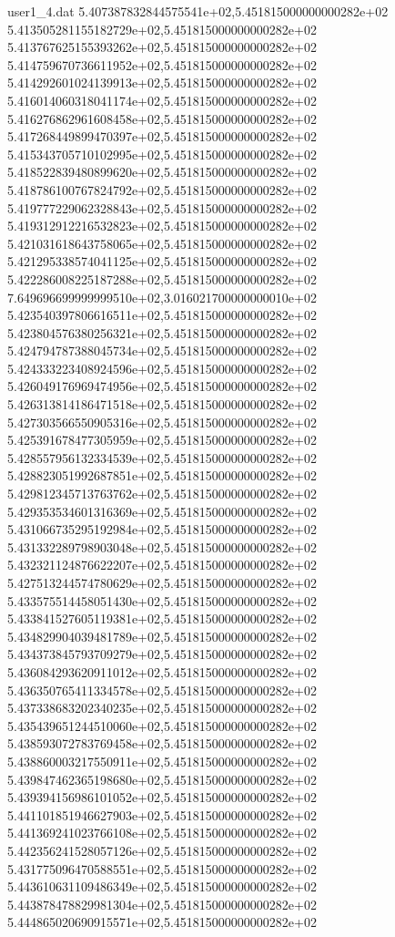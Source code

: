 \begin{filecontents}{user1_4.dat}
5.407387832844575541e+02,5.451815000000000282e+02
5.413505281155182729e+02,5.451815000000000282e+02
5.413767625155393262e+02,5.451815000000000282e+02
5.414759670736611952e+02,5.451815000000000282e+02
5.414292601024139913e+02,5.451815000000000282e+02
5.416014060318041174e+02,5.451815000000000282e+02
5.416276862961608458e+02,5.451815000000000282e+02
5.417268449899470397e+02,5.451815000000000282e+02
5.415343705710102995e+02,5.451815000000000282e+02
5.418522839480899620e+02,5.451815000000000282e+02
5.418786100767824792e+02,5.451815000000000282e+02
5.419777229062328843e+02,5.451815000000000282e+02
5.419312912216532823e+02,5.451815000000000282e+02
5.421031618643758065e+02,5.451815000000000282e+02
5.421295338574041125e+02,5.451815000000000282e+02
5.422286008225187288e+02,5.451815000000000282e+02
7.649696699999999510e+02,3.016021700000000010e+02
5.423540397806616511e+02,5.451815000000000282e+02
5.423804576380256321e+02,5.451815000000000282e+02
5.424794787388045734e+02,5.451815000000000282e+02
5.424333223408924596e+02,5.451815000000000282e+02
5.426049176969474956e+02,5.451815000000000282e+02
5.426313814186471518e+02,5.451815000000000282e+02
5.427303566550905316e+02,5.451815000000000282e+02
5.425391678477305959e+02,5.451815000000000282e+02
5.428557956132334539e+02,5.451815000000000282e+02
5.428823051992687851e+02,5.451815000000000282e+02
5.429812345713763762e+02,5.451815000000000282e+02
5.429353534601316369e+02,5.451815000000000282e+02
5.431066735295192984e+02,5.451815000000000282e+02
5.431332289798903048e+02,5.451815000000000282e+02
5.432321124876622207e+02,5.451815000000000282e+02
5.427513244574780629e+02,5.451815000000000282e+02
5.433575514458051430e+02,5.451815000000000282e+02
5.433841527605119381e+02,5.451815000000000282e+02
5.434829904039481789e+02,5.451815000000000282e+02
5.434373845793709279e+02,5.451815000000000282e+02
5.436084293620911012e+02,5.451815000000000282e+02
5.436350765411334578e+02,5.451815000000000282e+02
5.437338683202340235e+02,5.451815000000000282e+02
5.435439651244510060e+02,5.451815000000000282e+02
5.438593072783769458e+02,5.451815000000000282e+02
5.438860003217550911e+02,5.451815000000000282e+02
5.439847462365198680e+02,5.451815000000000282e+02
5.439394156986101052e+02,5.451815000000000282e+02
5.441101851946627903e+02,5.451815000000000282e+02
5.441369241023766108e+02,5.451815000000000282e+02
5.442356241528057126e+02,5.451815000000000282e+02
5.431775096470588551e+02,5.451815000000000282e+02
5.443610631109486349e+02,5.451815000000000282e+02
5.443878478829981304e+02,5.451815000000000282e+02
5.444865020690915571e+02,5.451815000000000282e+02

\end{filecontents}
